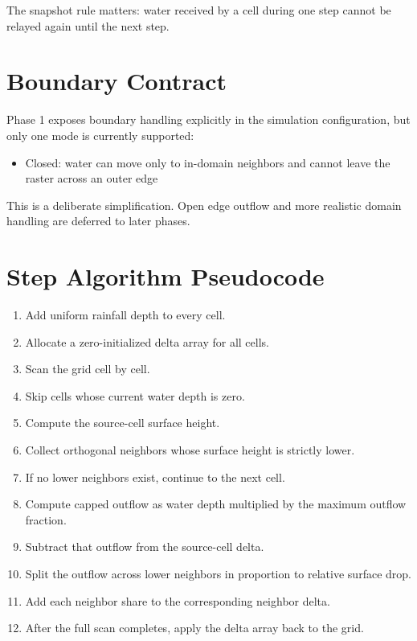 \documentclass[10pt]{article}
\begin{document}
The snapshot rule matters: water received by a cell during one step cannot be relayed again until the next step.

\section{Boundary Contract}

Phase 1 exposes boundary handling explicitly in the simulation configuration, but only one mode is currently supported:

\begin{itemize}
    \item Closed: water can move only to in-domain neighbors and cannot leave the raster across an outer edge
\end{itemize}

This is a deliberate simplification. Open edge outflow and more realistic domain handling are deferred to later phases.

\section{Step Algorithm Pseudocode}

\begin{enumerate}
    \item Add uniform rainfall depth to every cell.
    \item Allocate a zero-initialized delta array for all cells.
    \item Scan the grid cell by cell.
    \item Skip cells whose current water depth is zero.
    \item Compute the source-cell surface height.
    \item Collect orthogonal neighbors whose surface height is strictly lower.
    \item If no lower neighbors exist, continue to the next cell.
    \item Compute capped outflow as water depth multiplied by the maximum outflow fraction.
    \item Subtract that outflow from the source-cell delta.
    \item Split the outflow across lower neighbors in proportion to relative surface drop.
    \item Add each neighbor share to the corresponding neighbor delta.
    \item After the full scan completes, apply the delta array back to the grid.
\end{enumerate}
\end{document}
